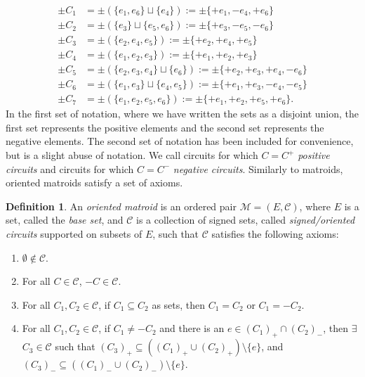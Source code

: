 \documentclass[12pt]{report}
\theoremstyle{definition}
\newtheorem{definition}[theorem]{Definition}
\def\calC{\mathcal C}
\def\calM{\mathcal M}
\theoremstyle{upright}
\begin{document}
\[\begin{aligned}
    \pm C_1&=\pm(\{e_1, e_6\}\sqcup\{e_4\}):=\pm\{+e_1, -e_4, +e_6\}\\
    \pm C_2&=\pm(\{e_3\}\sqcup\{e_5, e_6\}):=\pm\{+e_3, -e_5, -e_6\}\\
    \pm C_3&=\pm(\{e_2, e_4, e_5\}):=\pm\{+e_2, +e_4, +e_5\}\\
    \pm C_4&=\pm(\{e_1, e_2, e_3\}):=\pm\{+e_1, +e_2, +e_3\}\\
    \pm C_5&=\pm(\{e_2, e_3, e_4\}\sqcup\{e_6\}):=\pm\{+e_2, +e_3, +e_4, -e_6\}\\
    \pm C_6&=\pm(\{e_1, e_3\}\sqcup\{e_4, e_5\}):=\pm\{+e_1, +e_3, -e_4, -e_5\}\\
    \pm C_7&=\pm(\{e_1, e_2, e_5, e_6\}):=\pm\{+e_1, +e_2, +e_5, +e_6\}.
\end{aligned}\]
In the first set of notation, where we have written the sets as a disjoint union, the first set represents the positive elements and the second set represents the negative elements.
The second set of notation has been included for convenience, but is a slight abuse of notation.
We call circuits for which $C=C^+$ \textit{positive circuits} and circuits for which $C=C^-$ \textit{negative circuits}.
Similarly to matroids, oriented matroids satisfy a set of axioms.

\begin{definition}

    An \textit{oriented matroid} is an ordered pair $\calM=(E, \calC)$, where $E$ is a set, called the \textit{base set}, and $\calC$ is a collection of signed sets, called \textit{signed/oriented circuits} supported on subsets of $E$, such that $\calC$ satisfies the following axioms:
    
    \begin{enumerate}[label=($\pm$C\arabic*), leftmargin=*, align=left]
        \item $\emptyset\not\in\calC$.
        \item For all $C\in\calC$, $-C\in\calC$.
        \item For all $C_1,C_2\in\calC$, if $C_1\subseteq C_2$ as sets, then $C_1=C_2$ or $C_1=-C_2$.
        \item For all $C_1,C_2\in\calC$, if $C_1\neq -C_2$ and there is an $e\in(C_1)_+\cap (C_2)_-$, then $\exists$ $C_3\in\calC$ such that $(C_3)_+\subseteq((C_1)_+\cup(C_2)_+)\setminus\{e\}$, and $(C_3)_-\subseteq((C_1)_-\cup(C_2)_-)\setminus\{e\}$.
    \end{enumerate}
    
\end{definition}
\end{document}
